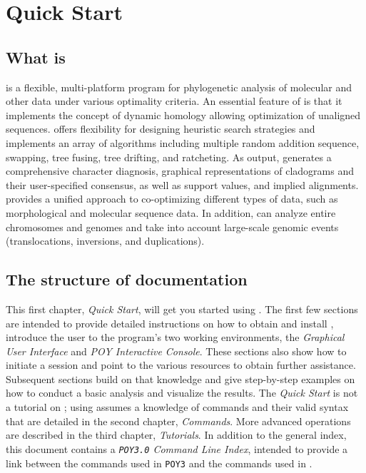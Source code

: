 \chapter{\poy Quick Start}

\section{What is \poy}

\poy is a flexible, multi-platform program for phylogenetic analysis of molecular and other data under various optimality criteria. An essential feature of \poy is that it implements the concept of dynamic homology allowing optimization of unaligned sequences. \poy offers flexibility for designing heuristic search strategies and implements an array of algorithms including multiple random addition sequence, swapping, tree fusing, tree drifting, and ratcheting. As output, \poy generates a comprehensive character diagnosis, graphical representations of cladograms and their user-specified consensus, as well as support values, and implied alignments. \poy provides a unified approach to co-optimizing different types of data, such as morphological and molecular sequence data. In addition, \poy can analyze entire chromosomes and genomes and take into account large-scale genomic events (translocations, inversions, and duplications).


\section{The structure of \poy documentation}
This first chapter, \emph{\poy Quick Start}, will get you started using \poy. The first few sections are intended to provide detailed instructions on how to obtain and install \poy, introduce the user to the program's two working environments, the \emph{Graphical User Interface} and \emph{POY Interactive Console}. These sections also show how to initiate a \poy session and point to the various resources to obtain further assistance. Subsequent sections build on that knowledge and give step-by-step examples on how to conduct a basic analysis and visualize the results. The \emph{\poy Quick Start} is not a tutorial on \poy; using \poy assumes a knowledge of \poy commands and their valid syntax that are detailed in the second chapter, \emph{\poy Commands}. More advanced operations are described in the third chapter, \emph{\poy Tutorials}. In addition to the general index, this document contains a \emph{\texttt{POY3.0} Command Line Index}, intended to provide a link between the commands used in \texttt{POY3} and the commands used in \poy. 

